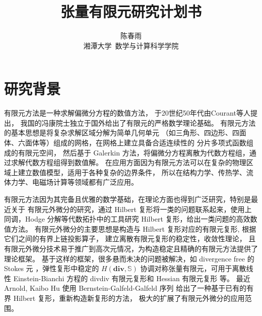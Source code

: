 \documentclass[lang=cn,a4paper,newtx]{elegantpaper}
\title{张量有限元研究计划书}
\author{陈春雨 \\ 湘潭大学\ 数学与计算科学学院}
\date{\zhdate{2024/9/18}}
\begin{document}
\maketitle

\section{研究背景}

有限元方法\cite{brenner2008mathematical}是一种求解偏微分方程的数值方法，
于20世纪50年代由Courant等人提出，
我国的冯康院士独立于国外给出了有限元的严格数学理论基础。
有限元方法的基本思想是将复杂求解区域分解为简单几何单元
（如三角形、四边形、四面体、六面体等）组成的网格，在网格上建立具备合适连续性的
分片多项式函数组成的有限元空间， 然后基于 Galerkin
方法，将偏微分方程离散为代数方程组，通过求解代数方程组得到数值解。
在应用方面因为有限元方法可以在复杂的物理区域上建立数值模型，适用于各种复杂的边界条件，
所以在结构力学、传热学、流体力学、电磁场计算等领域都有广泛应用。

有限元方法因为其完备且优雅的数学基础，在理论方面也得到广泛研究，特别是最近关于
有限元外微分\cite{arnold2006finite, arnold2018finite}的研究，通过 Hilbert
复形将一类的问题联系起来，使用上同调，Hodge 分解等代数拓扑中的工具研究 Hilbert 
复形，给出一类问题的高效数值方法。
有限元外微分的主要思想是构造与 Hilbert 复形对应的有限元复形,
根据它们之间的有界上链投影算子，
建立离散有限元复形的稳定性，收敛性理论\cite{arnold2010finite}，
且有限元外微分技术易于推广到高次元情况，为构造稳定且精确的有限元方法提供了理论框架。
基于这样的框架，很多悬而未决的问题被解决，如 divergence free 的 Stokes 元
\cite{neilan2015discrete}，弹性复形中稳定的 $H(\mathbf{div}, \mathbb{S})$ 
协调对称张量有限元\cite{hu2015finite, hu2015family}，可用于离散线性 
Einstein-Bianchi 方程的 divdiv 有限元复形和 Hessian 有限元复形
\cite{huliangma2022conforming, chen2024new, huliang2021conforming} 等。
最近 Arnold, Kaibo Hu \cite{arnold2021complexes} 使用 
Bernstein-Galfeld-Galfeld 序列
给出了一种基于已有的有界 Hilbert 复形，重新构造新复形的方法，
极大的扩展了有限元外微分的应用范围。

%
%
%
%
\end{document}

